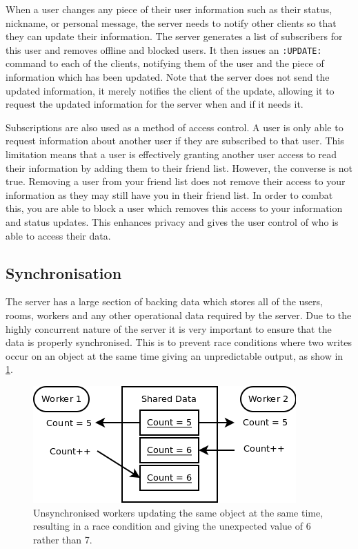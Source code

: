 When a user changes any piece of their user information such as their status, nickname, or personal message, the server needs to notify other clients so that they can update their information. The server generates a list of subscribers for this user and removes offline and blocked users. It then issues an \texttt{:UPDATE:} command to each of the clients, notifying them of the user and the piece of information which has been updated. Note that the server does not send the updated information, it merely notifies the client of the update, allowing it to request the updated information for the server when and if it needs it.

Subscriptions are also used as a method of access control. A user is only able to request information about another user if they are subscribed to that user. This limitation means that a user is effectively granting another user access to read their information by adding them to their friend list. However, the converse is not true. Removing a user from your friend list does not remove their access to your information as they may still have you in their friend list. In order to combat this, you are able to block a user which removes this access to your information and status updates. This enhances privacy and gives the user control of who is able to access their data.

\subsection{Synchronisation}
The server has a large section of backing data which stores all of the users, rooms, workers and any other operational data required by the server. Due to the highly concurrent nature of the server it is very important to ensure that the data is properly synchronised. This is to prevent race conditions where two writes occur on an object at the same time giving an unpredictable output, as show in \ref{RaceConditionDia}.

\begin{figure}
    \begin{center}
        \includegraphics[scale=0.6]{Design/diagrams/server_race_condition.png}
        \caption{Unsynchronised workers updating the same object at the same time, resulting in a race condition and giving the unexpected value of 6 rather than 7.}
        \label{RaceConditionDia}
    \end{center}
\end{figure}

